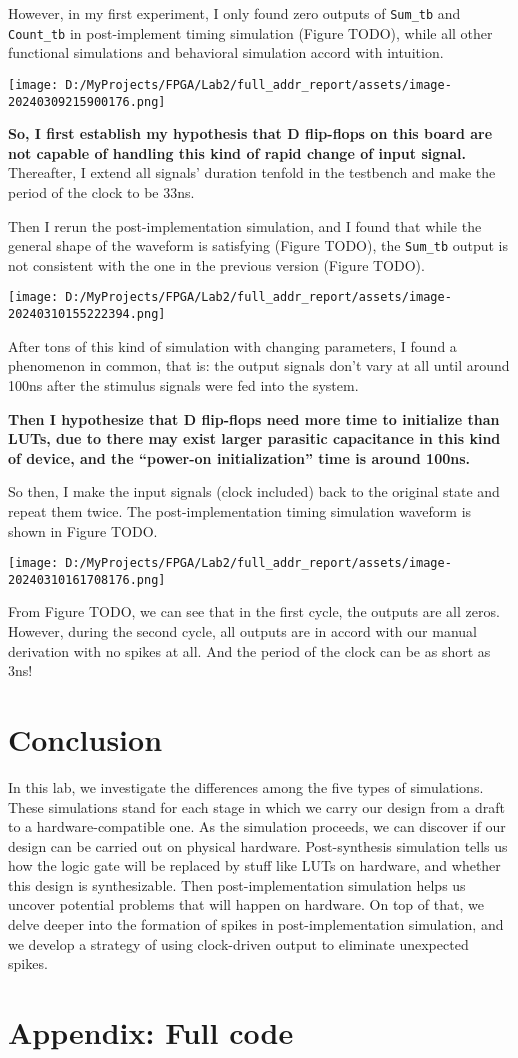 \documentclass[
]{article}
\begin{document}
However, in my first experiment, I only found zero outputs of
\texttt{Sum\_tb} and \texttt{Count\_tb} in post-implement timing
simulation (Figure TODO), while all other functional simulations and
behavioral simulation accord with intuition.

\texttt{[image: D:/MyProjects/FPGA/Lab2/full\_addr\_report/assets/image-20240309215900176.png]}

\textbf{So, I first establish my hypothesis that D flip-flops on this
board are not capable of handling this kind of rapid change of input
signal.} Thereafter, I extend all signals' duration tenfold in the
testbench and make the period of the clock to be 33ns.

Then I rerun the post-implementation simulation, and I found that while
the general shape of the waveform is satisfying (Figure TODO), the
\texttt{Sum\_tb} output is not consistent with the one in the previous
version (Figure TODO).

\texttt{[image: D:/MyProjects/FPGA/Lab2/full\_addr\_report/assets/image-20240310155222394.png]}

After tons of this kind of simulation with changing parameters, I found
a phenomenon in common, that is: the output signals don't vary at all
until around 100ns after the stimulus signals were fed into the system.

\textbf{Then I hypothesize that D flip-flops need more time to
initialize than LUTs, due to there may exist larger parasitic
capacitance in this kind of device, and the ``power-on initialization''
time is around 100ns.}

So then, I make the input signals (clock included) back to the original
state and repeat them twice. The post-implementation timing simulation
waveform is shown in Figure TODO.

\texttt{[image: D:/MyProjects/FPGA/Lab2/full\_addr\_report/assets/image-20240310161708176.png]}

From Figure TODO, we can see that in the first cycle, the outputs are
all zeros. However, during the second cycle, all outputs are in accord
with our manual derivation with no spikes at all. And the period of the
clock can be as short as 3ns!

\hypertarget{conclusion}{%
\section{Conclusion}\label{conclusion}}

In this lab, we investigate the differences among the five types of
simulations. These simulations stand for each stage in which we carry
our design from a draft to a hardware-compatible one. As the simulation
proceeds, we can discover if our design can be carried out on physical
hardware. Post-synthesis simulation tells us how the logic gate will be
replaced by stuff like LUTs on hardware, and whether this design is
synthesizable. Then post-implementation simulation helps us uncover
potential problems that will happen on hardware. On top of that, we
delve deeper into the formation of spikes in post-implementation
simulation, and we develop a strategy of using clock-driven output to
eliminate unexpected spikes.

\hypertarget{appendix-full-code}{%
\section{Appendix: Full code}\label{appendix-full-code}}
\end{document}
